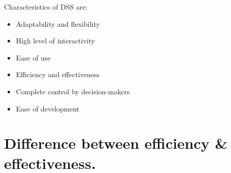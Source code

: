 \documentclass[10pt]{article}
\begin{document}
Characteristics of DSS are:
\begin{itemize}
  \item Adaptability and flexibility
  \item High level of interactivity
  \item Ease of use
  \item Efficiency and effectiveness
  \item Complete control by decision-makers
  \item Ease of development
  
\end{itemize}

\newpage
\section{Difference between efficiency \& effectiveness.}
\end{document}
